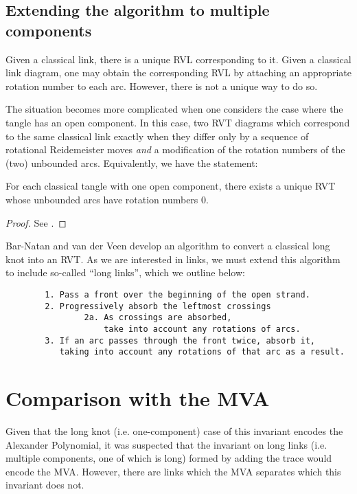 \documentclass{article}
\begin{document}
\subsection{Extending the algorithm to multiple components}

Given a classical link, there is a unique \ac{RVL} corresponding to it. Given a
classical link diagram, one may obtain the corresponding \ac{RVL} by attaching
an appropriate rotation number to each arc. However, there is not a unique way
to do so.

The situation becomes more complicated when one considers the case where the
tangle has an open component. In this case, two \ac{RVT} diagrams which
correspond to the same classical link exactly when they differ only by a
sequence of rotational Reidemeister moves \emph{and} a modification of the
rotation numbers of the (two) unbounded arcs. Equivalently, we have the
statement:

\begin{lemma}
        For each classical tangle with one open component, there exists a unique
        \ac{RVT} whose unbounded arcs have rotation numbers $0$.
\end{lemma}
\begin{proof}
        See \cite{BV}.
\end{proof}

Bar-Natan and van der Veen develop an algorithm to convert a classical long knot
into an \ac{RVT}. As we are interested in links, we must extend this algorithm
to include so-called \enquote{long links}, which we outline below:
\begin{verbatim}
        1. Pass a front over the beginning of the open strand.
        2. Progressively absorb the leftmost crossings
                2a. As crossings are absorbed,
                    take into account any rotations of arcs.
        3. If an arc passes through the front twice, absorb it,
           taking into account any rotations of that arc as a result.
\end{verbatim}

\section{Comparison with the \ac{MVA}}

Given that the long knot (i.e. one-component) case of this invariant
encodes the Alexander Polynomial, it was suspected that the invariant on long
links (i.e. multiple components, one of which is long) formed by adding the
trace would encode the \ac{MVA}. However, there are links which the \ac{MVA}
separates which this invariant does not.
\end{document}
